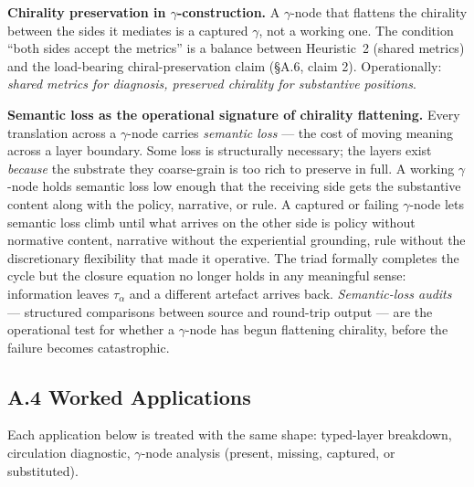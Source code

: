 \documentclass[
]{article}
\begin{document}
\textbf{Chirality preservation in \(\gamma\)-construction.} A
\(\gamma\)-node that flattens the chirality between the sides it
mediates is a captured \(\gamma\), not a working one. The condition
``both sides accept the metrics'' is a balance between Heuristic~2
(shared metrics) and the load-bearing chiral-preservation claim
(\S A.6, claim 2). Operationally: \emph{shared metrics for diagnosis,
preserved chirality for substantive positions}.

\textbf{Semantic loss as the operational signature of chirality
flattening.} Every translation across a \(\gamma\)-node carries
\emph{semantic loss} --- the cost of moving meaning across a layer
boundary. Some loss is structurally necessary; the layers exist
\emph{because} the substrate they coarse-grain is too rich to
preserve in full. A working \(\gamma\)-node holds semantic loss low
enough that the receiving side gets the substantive content along
with the policy, narrative, or rule. A captured or failing
\(\gamma\)-node lets semantic loss climb until what arrives on the
other side is policy without normative content, narrative without
the experiential grounding, rule without the discretionary
flexibility that made it operative. The triad formally completes the
cycle but the closure equation no longer holds in any meaningful
sense: information leaves \(\tau_\alpha\) and a different artefact
arrives back. \emph{Semantic-loss audits} --- structured comparisons
between source and round-trip output --- are the operational test
for whether a \(\gamma\)-node has begun flattening chirality, before
the failure becomes catastrophic.

\subsection{A.4 Worked
Applications}\label{appendix-a-applications}

Each application below is treated with the same shape: typed-layer
breakdown, circulation diagnostic, \(\gamma\)-node analysis (present,
missing, captured, or substituted).
\end{document}
